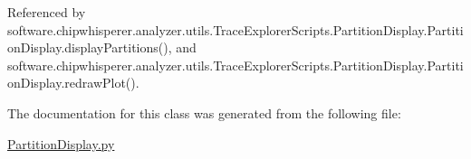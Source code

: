 Referenced by software.\+chipwhisperer.\+analyzer.\+utils.\+Trace\+Explorer\+Scripts.\+Partition\+Display.\+Partition\+Display.\+display\+Partitions(), and software.\+chipwhisperer.\+analyzer.\+utils.\+Trace\+Explorer\+Scripts.\+Partition\+Display.\+Partition\+Display.\+redraw\+Plot().



The documentation for this class was generated from the following file\+:\begin{DoxyCompactItemize}
\item 
\hyperlink{PartitionDisplay_8py}{Partition\+Display.\+py}\end{DoxyCompactItemize}
